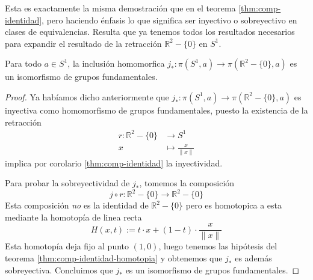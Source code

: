 Esta es exactamente la misma demostración que en el teorema
\ref{thm:comp-identidad}, pero haciendo énfasis lo que significa ser
inyectivo o sobreyectivo en clases de equivalencias. Resulta que ya
tenemos todos los resultados necesarios para expandir el resultado de la
retracción \(\mathbb R ^2 - \{0\}\) en \(S^1\).

\begin{teorema}
  Para todo \(a \in S^1\), la inclusión homomorfica \(j_* : \pi (S^1, a)
  \to \pi (\mathbb R ^2 - \{0\}, a)\) es un isomorfismo de grupos
  fundamentales.
\end{teorema}
\begin{proof}
  Ya habíamos dicho anteriormente que \( j_* : \pi (S^1, a) \to \pi
  (\mathbb R ^2 - \{0\}, a)\) es inyectiva como homomorfismo de grupos
  fundamentales, puesto la existencia de la retracción
  \begin{align*}
    r : \mathbb R ^2 - \{0\} &\to S^1 \\
    x &\mapsto \frac x {\lVert x \rVert}
  \end{align*}
  implica por corolario \ref{thm:comp-identidad} la inyectividad.

  Para probar la sobreyectividad de \(j_*\), tomemos la composición
  \[ j \circ r : \mathbb R ^2 - \{0\} \to \mathbb R ^2 - \{0\} \]
  Esta composición \emph{no} es la identidad de \(\mathbb R ^2 - \{0\}
  \) pero es homotopica a esta mediante la homotopía de linea recta
  \[ H(x,t) := t \cdot x + (1 - t) \cdot \frac x {\lVert x \rVert} \]
  Esta homotopía deja fijo al punto \((1,0)\), luego tenemos las
  hipótesis del teorema \ref{thm:comp-identidad-homotopia} y obtenemos
  que \(j_*\) es además sobreyectiva. Concluimos que \(j_*\) es un
  isomorfismo de grupos fundamentales.
\end{proof}

